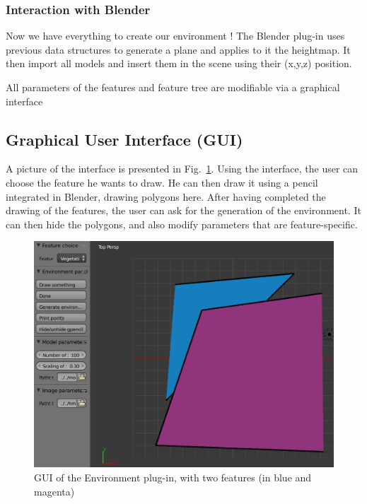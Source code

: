 \subsubsection{Interaction with Blender}
Now we have everything to create our environment !
The Blender plug-in uses previous data structures to generate a plane and applies to it the heightmap. It then import all models and insert them in the scene using their (x,y,z) position.

All parameters of the features and feature tree are modifiable via a graphical interface


\subsection{Graphical User Interface (GUI)}

A picture of the interface is presented in
Fig.~\ref{fig:env-gui1}. Using the interface, the user can choose the
feature he wants to draw. He can then draw it using a pencil
integrated in Blender, drawing polygons here. After having completed
the drawing of the features, the user can ask for the generation of
the environment. It can then hide the polygons, and also modify
parameters that are feature-specific.

\begin{figure}[h]
\includegraphics[width=\textwidth]{img/env_gui1.png}
\caption{GUI of the Environment plug-in, with two features (in blue
and magenta)}
\label{fig:env-gui1}
\end{figure}

